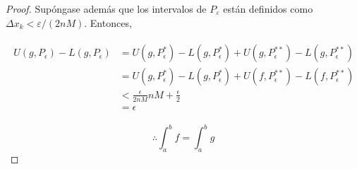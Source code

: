 \begin{problema}
\begin{enumerate}
\begin{proof}
	Supóngase además que los intervalos de $P_\varepsilon$ están definidos como $\Delta x_k< \varepsilon/ (2nM)$. Entonces, 
	
	\begin{align*}
		\begin{aligned}
			U\left(g, P_{\epsilon}\right)-L\left(g, P_{\epsilon}\right) &=U\left(g, P_{\epsilon}^{*}\right)-L\left(g, P_{\epsilon}^{*}\right)+U\left(g, P_{\epsilon}^{**}\right)-L\left(g, P_{\epsilon}^{**}\right) \\
			&=U\left(g, P_{\epsilon}^{*}\right)-L\left(g, P_{\epsilon}^{*}\right)+U\left(f, P_{\epsilon}^{**}\right)-L\left(f, P_{\epsilon}^{**}\right) \\
			&<\frac{\epsilon}{2 nM} n M+\frac{\epsilon}{2} \\
			&=\epsilon
		\end{aligned}
	\end{align*}

	$$
	\therefore	\int_{a}^{b} f=\int_{a}^{b} g
	$$
	
		\end{proof}
	\end{enumerate}
\end{problema}









